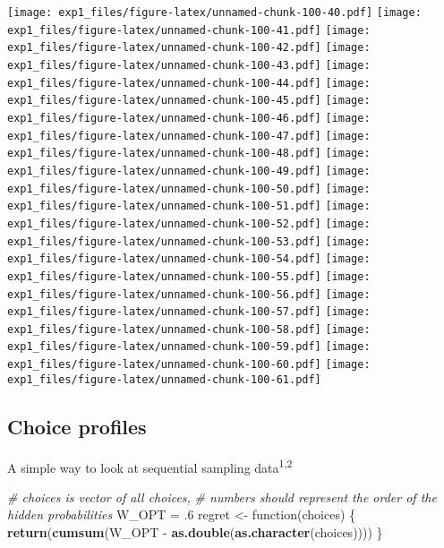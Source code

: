 \documentclass[11pt,,]{article}
\newenvironment{Shaded}{\begin{snugshade}}{\end{snugshade}}
\newcommand{\KeywordTok}[1]{\textcolor[rgb]{0.13,0.29,0.53}{\textbf{{#1}}}}
\newcommand{\DecValTok}[1]{\textcolor[rgb]{0.00,0.00,0.81}{{#1}}}
\newcommand{\StringTok}[1]{\textcolor[rgb]{0.31,0.60,0.02}{{#1}}}
\newcommand{\CommentTok}[1]{\textcolor[rgb]{0.56,0.35,0.01}{\textit{{#1}}}}
\newcommand{\NormalTok}[1]{{#1}}
\newcommand*\cleartoleftpage{%
  \clearpage
  \ifodd\value{page}\hbox{}\newpage\fi
}
\begin{document}
\texttt{[image: exp1\_files/figure-latex/unnamed-chunk-100-40.pdf]}
\texttt{[image: exp1\_files/figure-latex/unnamed-chunk-100-41.pdf]}
\texttt{[image: exp1\_files/figure-latex/unnamed-chunk-100-42.pdf]}
\texttt{[image: exp1\_files/figure-latex/unnamed-chunk-100-43.pdf]}
\texttt{[image: exp1\_files/figure-latex/unnamed-chunk-100-44.pdf]}
\texttt{[image: exp1\_files/figure-latex/unnamed-chunk-100-45.pdf]}
\texttt{[image: exp1\_files/figure-latex/unnamed-chunk-100-46.pdf]}
\texttt{[image: exp1\_files/figure-latex/unnamed-chunk-100-47.pdf]}
\texttt{[image: exp1\_files/figure-latex/unnamed-chunk-100-48.pdf]}
\texttt{[image: exp1\_files/figure-latex/unnamed-chunk-100-49.pdf]}
\texttt{[image: exp1\_files/figure-latex/unnamed-chunk-100-50.pdf]}
\texttt{[image: exp1\_files/figure-latex/unnamed-chunk-100-51.pdf]}
\texttt{[image: exp1\_files/figure-latex/unnamed-chunk-100-52.pdf]}
\texttt{[image: exp1\_files/figure-latex/unnamed-chunk-100-53.pdf]}
\texttt{[image: exp1\_files/figure-latex/unnamed-chunk-100-54.pdf]}
\texttt{[image: exp1\_files/figure-latex/unnamed-chunk-100-55.pdf]}
\texttt{[image: exp1\_files/figure-latex/unnamed-chunk-100-56.pdf]}
\texttt{[image: exp1\_files/figure-latex/unnamed-chunk-100-57.pdf]}
\texttt{[image: exp1\_files/figure-latex/unnamed-chunk-100-58.pdf]}
\texttt{[image: exp1\_files/figure-latex/unnamed-chunk-100-59.pdf]}
\texttt{[image: exp1\_files/figure-latex/unnamed-chunk-100-60.pdf]}
\texttt{[image: exp1\_files/figure-latex/unnamed-chunk-100-61.pdf]}

\cleartoleftpage

\subsection{Choice profiles}\label{choice-profiles}

A simple way to look at sequential sampling data\textsuperscript{1,2}

\begin{Shaded}
\begin{Highlighting}[]
\CommentTok{# choices is vector of all choices, }
\CommentTok{# numbers should represent the order of the hidden probabilities}
\NormalTok{W_OPT =}\StringTok{ }\NormalTok{.}\DecValTok{6}
\NormalTok{regret <-}\StringTok{ }\NormalTok{function(choices) \{ }
    \KeywordTok{return}\NormalTok{(}\KeywordTok{cumsum}\NormalTok{(W_OPT -}\StringTok{ }\KeywordTok{as.double}\NormalTok{(}\KeywordTok{as.character}\NormalTok{(choices))))}
\NormalTok{\}}
\end{Highlighting}
\end{Shaded}
\end{document}
